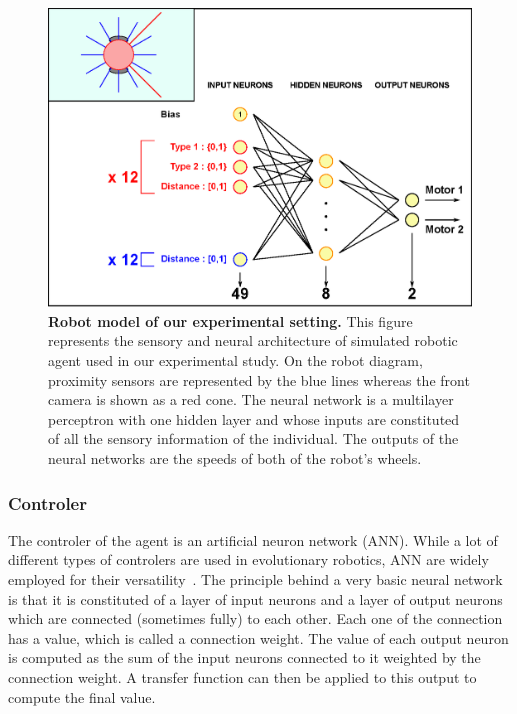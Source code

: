     \begin{figure}[hbtp]
        \begin{center}
          \includegraphics[scale = 0.60]{fig/Intro/RobotModel.eps}
          \caption{\textbf{Robot model of our experimental setting.}
          This figure represents the sensory and neural architecture of simulated robotic agent used in our experimental study. On the robot diagram, proximity sensors are represented by the blue lines whereas the front camera is shown as a red cone. The neural network is a multilayer perceptron with one hidden layer and whose inputs are constituted of all the sensory information of the individual. The outputs of the neural networks are the speeds of both of the robot's wheels.} 
          \label{fig:RobotModel}
        \end{center}
    \end{figure}

    \subsubsection{Controler} The controler of the agent is an artificial neuron network (ANN). While a lot of different types of controlers are used in evolutionary robotics, ANN are widely employed for their versatility~\parencite{Doncieux2015}. The principle behind a very basic neural network is that it is constituted of a layer of input neurons and a layer of output neurons which are connected (sometimes fully) to each other. Each one of the connection has a value, which is called a connection weight. The value of each output neuron is computed as the sum of the input neurons connected to it weighted by the connection weight. A transfer function can then be applied to this output to compute the final value. 

